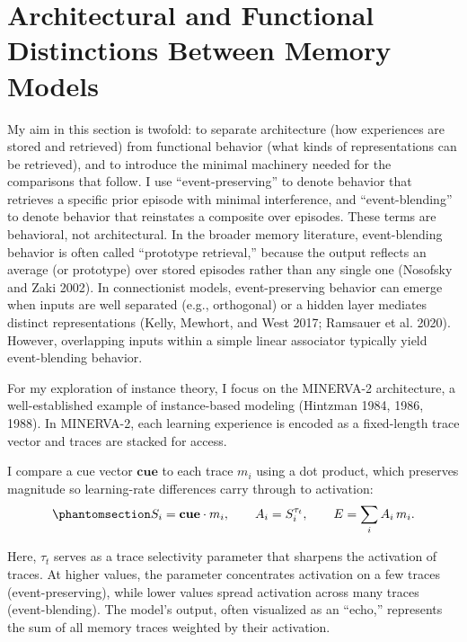 \documentclass[
  letterpaper,
  11pt,
  english,
  singlespacing,
  headsepline]{MastersDoctoralThesis}
\begin{document}
\section{Architectural and Functional Distinctions Between Memory
Models}\label{architectural-and-functional-distinctions-between-memory-models}

My aim in this section is twofold: to separate architecture (how
experiences are stored and retrieved) from functional behavior (what
kinds of representations can be retrieved), and to introduce the minimal
machinery needed for the comparisons that follow. I use
``event-preserving'' to denote behavior that retrieves a specific prior
episode with minimal interference, and ``event-blending'' to denote
behavior that reinstates a composite over episodes. These terms are
behavioral, not architectural. In the broader memory literature,
event-blending behavior is often called ``prototype retrieval,'' because
the output reflects an average (or prototype) over stored episodes
rather than any single one (Nosofsky and Zaki 2002). In connectionist
models, event-preserving behavior can emerge when inputs are well
separated (e.g., orthogonal) or a hidden layer mediates distinct
representations (Kelly, Mewhort, and West 2017; Ramsauer et al. 2020).
However, overlapping inputs within a simple linear associator typically
yield event-blending behavior.

For my exploration of instance theory, I focus on the MINERVA-2
architecture, a well-established example of instance-based modeling
(Hintzman 1984, 1986, 1988). In MINERVA-2, each learning experience is
encoded as a fixed-length trace vector and traces are stacked for
access.

I compare a cue vector \(\mathbf{cue}\) to each trace \(m_i\) using a
dot product, which preserves magnitude so learning-rate differences
carry through to activation:
\begin{equation}\phantomsection\label{eq-intro1}{
S_i = \mathbf{cue}\cdot m_i,\qquad 
A_i = S_i^{\tau_t},\qquad 
E = \sum_i A_i\, m_i.
}\end{equation}

Here, \(\tau_t\) serves as a trace selectivity parameter that sharpens
the activation of traces. At higher values, the parameter concentrates
activation on a few traces (event-preserving), while lower values spread
activation across many traces (event-blending). The model's output,
often visualized as an ``echo,'' represents the sum of all memory traces
weighted by their activation.
\end{document}

